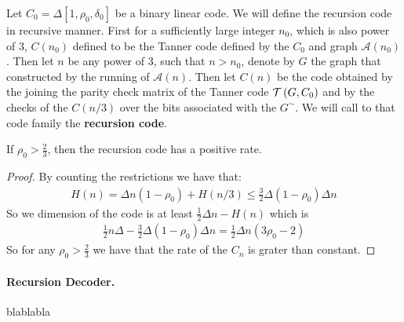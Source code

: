 \documentclass{article}
\begin{document}
\begin{definition} Let $C_{0}=\Delta[1,\rho_{0}, \delta_{0}]$ be a binary linear code.  We will define the recursion code in recursive manner. First for a sufficiently large integer $n_{0}$, which is also power of $3$, $C\left( n_{0} \right)$ defined to be the Tanner code defined by the $C_{0}$ and graph $\mathcal{A}\left( n_{0} \right)$. Then let $n$ be any power of $3$, such that $n > n_{0}$, denote by $G$ the graph that constructed by the running of $\mathcal{A}\left( n \right)$.  Then let $C\left( n \right)$ be the code obtained by the joining the parity check matrix of the Tanner code $\mathcal{T}\left( G, C_0 \right)$ and by the checks of the $C\left( n / 3 \right)$ over the bits associated with the $G^{\sim}$. We will call to that code family the \textbf{recursion code}.
\end{definition}
\begin{lemma}
  If $\rho_{0} > \frac{2}{3}$, then the recursion code has a positive rate.
\end{lemma}
\begin{proof}
By counting the restrictions we have that:  
\begin{equation*}
  \begin{split}
    H\left( n \right) = \Delta n \left( 1-\rho_{0} \right) + H\left( n/3 \right) \le \frac{3}{2}\Delta\left( 1 - \rho_{0} \right)\Delta n 
  \end{split}
\end{equation*}
So we dimension of the code is at least  $ \frac{1}{2}\Delta n - H\left( n \right) $ which is 
\begin{equation*}
  \begin{split}
    \frac{1}{2}n\Delta - \frac{3}{2}\Delta\left( 1 - \rho_{0} \right)\Delta n = \frac{1}{2}\Delta n\left(  3 \rho_{0} - 2  \right) 
  \end{split}
\end{equation*}
So for any $\rho_{0} > \frac{2}{3}$ we have that the rate of the $C_{n}$ is grater than constant. 
\end{proof}

\paragraph{Recursion Decoder.} blablabla


\printbibliography 
\end{document}
